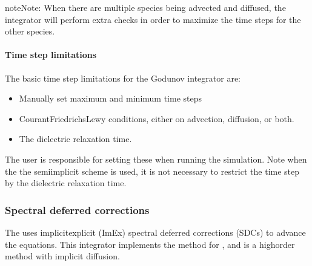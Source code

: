 \documentclass[letterpaper,10pt,english]{sphinxmanual}
\begin{document}
\begin{sphinxadmonition}{note}{Note:}
\sphinxAtStartPar
When there are multiple species being advected and diffused, the integrator will perform extra checks in order to maximize the time steps for the other species.
\end{sphinxadmonition}


\paragraph{Time step limitations}
\label{\detokenize{Applications/CdrPlasmaModel:time-step-limitations}}
\sphinxAtStartPar
The basic time step limitations for the Godunov integrator are:
\begin{itemize}
\item {} 
\sphinxAtStartPar
Manually set maximum and minimum time steps

\item {} 
\sphinxAtStartPar
Courant\sphinxhyphen{}Friedrichs\sphinxhyphen{}Lewy conditions, either on advection, diffusion, or both.

\item {} 
\sphinxAtStartPar
The dielectric relaxation time.

\end{itemize}

\sphinxAtStartPar
The user is responsible for setting these when running the simulation.
Note when the the semi\sphinxhyphen{}implicit scheme is used, it is not necessary to restrict the time step by the dielectric relaxation time.


\subsubsection{Spectral deferred corrections}
\label{\detokenize{Applications/CdrPlasmaModel:spectral-deferred-corrections}}\label{\detokenize{Applications/CdrPlasmaModel:chap-sisdc}}
\sphinxAtStartPar
The  uses implicit\sphinxhyphen{}explicit (ImEx) spectral deferred corrections (SDCs) to advance the equations.
This integrator implements the  method for , and is a high\sphinxhyphen{}order method with implicit diffusion.
\end{document}
